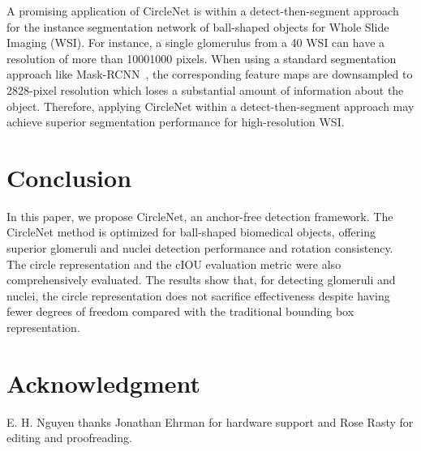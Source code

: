 \documentclass[journal]{IEEEtran}
\begin{document}
A promising application of CircleNet is within a detect-then-segment approach for the instance segmentation network of ball-shaped objects for Whole Slide Imaging (WSI). For instance, a single glomerulus from a 40 WSI can have a resolution of more than 10001000 pixels. When using a standard segmentation approach like Mask-RCNN~\cite{he2017mask}, the corresponding feature maps are downsampled to 2828-pixel resolution which loses a substantial amount of information about the object. Therefore, applying CircleNet within a detect-then-segment approach may achieve superior segmentation performance for high-resolution WSI.
\section{Conclusion}
In this paper, we propose CircleNet, an anchor-free detection framework. The CircleNet method is optimized for ball-shaped biomedical objects, offering superior glomeruli and nuclei detection performance and rotation consistency. The circle representation and the cIOU evaluation metric were also comprehensively evaluated. The results show that, for detecting glomeruli and nuclei, the circle representation does not sacrifice effectiveness despite having fewer degrees of freedom compared with the traditional bounding box representation.

\section*{Acknowledgment}
E. H. Nguyen thanks Jonathan Ehrman for hardware support and Rose Rasty for editing and proofreading.



\end{document}
